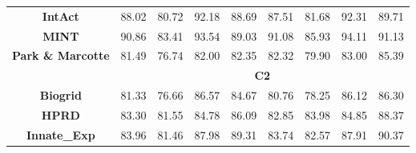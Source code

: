 \begin{table}[]
\begin{tabular}{|c|cccc|cccc|}
    \textbf{IntAct} & \cellcolor[rgb]{ .533,  .667,  .443} 88.02 & \cellcolor[rgb]{ .886,  .937,  .855} 80.72 & \cellcolor[rgb]{ .329,  .51,  .208} 92.18 & \cellcolor[rgb]{ .502,  .643,  .408} 88.69 & \cellcolor[rgb]{ .584,  .706,  .502} 87.51 & \cellcolor[rgb]{ .886,  .937,  .855} 81.68 & \cellcolor[rgb]{ .329,  .51,  .208} 92.31 & \cellcolor[rgb]{ .467,  .616,  .369} 89.71 \\
    \textbf{MINT} & \cellcolor[rgb]{ .478,  .624,  .38} 90.86 & \cellcolor[rgb]{ .886,  .937,  .855} 83.41 & \cellcolor[rgb]{ .329,  .51,  .208} 93.54 & \cellcolor[rgb]{ .58,  .702,  .498} 89.03 & \cellcolor[rgb]{ .537,  .671,  .451} 91.08 & \cellcolor[rgb]{ .886,  .937,  .855} 85.93 & \cellcolor[rgb]{ .329,  .51,  .208} 94.11 & \cellcolor[rgb]{ .533,  .667,  .447} 91.13 \\
    \textbf{Park \& Marcotte} & \cellcolor[rgb]{ .416,  .576,  .31} 81.49 & \cellcolor[rgb]{ .886,  .937,  .855} 76.74 & \cellcolor[rgb]{ .365,  .537,  .251} 82.00 & \cellcolor[rgb]{ .329,  .51,  .208} 82.35 & \cellcolor[rgb]{ .643,  .749,  .573} 82.32 & \cellcolor[rgb]{ .886,  .937,  .855} 79.90 & \cellcolor[rgb]{ .573,  .698,  .49} 83.00 & \cellcolor[rgb]{ .329,  .51,  .208} 85.39 \\
    \midrule
          & \multicolumn{8}{c|}{\textbf{C2}} \\
    \midrule
    \textbf{Biogrid} & \cellcolor[rgb]{ .627,  .737,  .553} 81.33 & \cellcolor[rgb]{ .886,  .937,  .855} 76.66 & \cellcolor[rgb]{ .329,  .51,  .208} 86.57 & \cellcolor[rgb]{ .439,  .592,  .333} 84.67 & \cellcolor[rgb]{ .714,  .808,  .655} 80.76 & \cellcolor[rgb]{ .886,  .937,  .855} 78.25 & \cellcolor[rgb]{ .345,  .522,  .224} 86.12 & \cellcolor[rgb]{ .329,  .51,  .208} 86.30 \\
    \textbf{HPRD} & \cellcolor[rgb]{ .675,  .776,  .608} 83.30 & \cellcolor[rgb]{ .886,  .937,  .855} 81.55 & \cellcolor[rgb]{ .49,  .635,  .396} 84.78 & \cellcolor[rgb]{ .329,  .51,  .208} 86.09 & \cellcolor[rgb]{ .886,  .937,  .855} 82.85 & \cellcolor[rgb]{ .773,  .851,  .725} 83.98 & \cellcolor[rgb]{ .686,  .784,  .624} 84.85 & \cellcolor[rgb]{ .329,  .51,  .208} 88.37 \\
    \textbf{Innate\_Exp} & \cellcolor[rgb]{ .71,  .804,  .651} 83.96 & \cellcolor[rgb]{ .886,  .937,  .855} 81.46 & \cellcolor[rgb]{ .424,  .584,  .318} 87.98 & \cellcolor[rgb]{ .329,  .51,  .208} 89.31 & \cellcolor[rgb]{ .804,  .875,  .761} 83.74 & \cellcolor[rgb]{ .886,  .937,  .855} 82.57 & \cellcolor[rgb]{ .506,  .647,  .416} 87.91 & \cellcolor[rgb]{ .329,  .51,  .208} 90.37 \\

\end{tabular}
\end{table}
